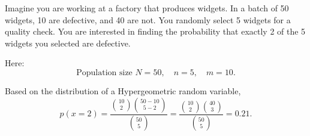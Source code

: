 \documentclass{article}
\begin{document}
Imagine you are working at a factory that produces widgets. In a batch of 50 widgets, 10 are defective, and 40 are not. You randomly select 5 widgets for a quality check. You are interested in finding the probability that exactly 2 of the 5 widgets you selected are defective.

Here:
\[
\text{Population size } N = 50, \quad n = 5, \quad m = 10.
\]

Based on the distribution of a Hypergeometric random variable,
\[
p(x = 2) = \frac{\binom{10}{2} \binom{50 - 10}{5 - 2}}{\binom{50}{5}} = \frac{\binom{10}{2} \binom{40}{3}}{\binom{50}{5}} = 0.21.
\]
\end{document}
